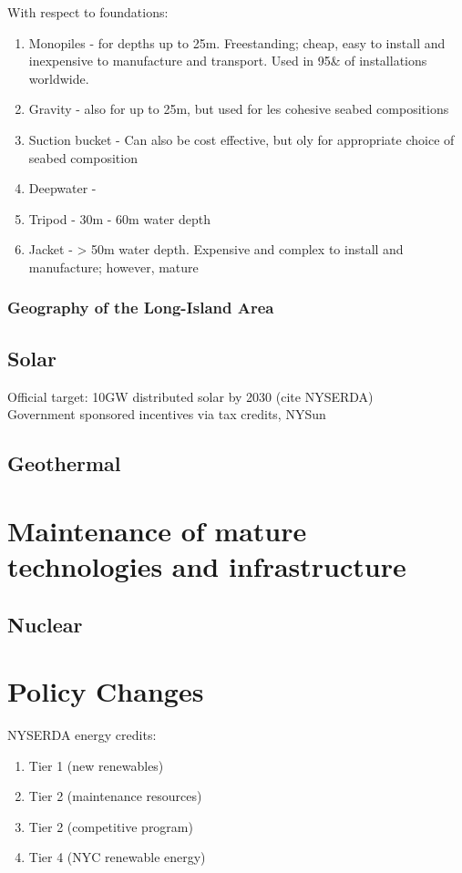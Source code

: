 \documentclass[plain]{article}
\newcommand{\1}{\mathbbm{1}}
\begin{document}
With respect to foundations: \cite{mitchell_review_2022}
\begin{enumerate}
	\item Monopiles - for depths up to 25m. Freestanding; cheap, easy to install and inexpensive to manufacture and transport. Used in 95\& of installations worldwide.
	\item Gravity - also for up to 25m, but used for les cohesive seabed compositions
	\item Suction bucket - Can also be cost effective, but oly for appropriate choice of seabed composition
	\item Deepwater - 
	\item Tripod - 30m - 60m water depth
	\item Jacket - > 50m water depth. Expensive and complex to install and manufacture; however, mature
\end{enumerate}
\subsubsection{Geography of the Long-Island Area}

\subsection{Solar}
Official target: 10GW distributed solar by 2030 (cite NYSERDA)\\
Government sponsored incentives via tax credits, NYSun

\subsection{Geothermal}
\section{Maintenance of mature technologies and infrastructure}
\subsection{Nuclear}



\section{Policy Changes}
NYSERDA energy credits:
	\begin{enumerate}
		\item Tier 1 (new renewables)
		\item Tier 2 (maintenance resources)
		\item Tier 2 (competitive program)
		\item Tier 4 (NYC renewable energy)
	\end{enumerate}
\end{document}
